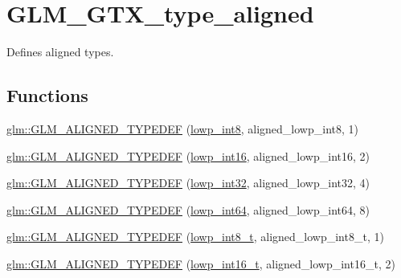 \hypertarget{group__gtx__type__aligned}{}\section{G\+L\+M\+\_\+\+G\+T\+X\+\_\+type\+\_\+aligned}
\label{group__gtx__type__aligned}


Defines aligned types.  


\subsection*{Functions}
\begin{DoxyCompactItemize}
\item 
\hyperlink{group__gtx__type__aligned_gab5cd5c5fad228b25c782084f1cc30114}{glm\+::\+G\+L\+M\+\_\+\+A\+L\+I\+G\+N\+E\+D\+\_\+\+T\+Y\+P\+E\+D\+EF} (\hyperlink{group__gtc__type__precision_gaf9e675b6392764242ae87eb179e9d3d6}{lowp\+\_\+int8}, aligned\+\_\+lowp\+\_\+int8, 1)
\item 
\hyperlink{group__gtx__type__aligned_ga5bb5dd895ef625c1b113f2cf400186b0}{glm\+::\+G\+L\+M\+\_\+\+A\+L\+I\+G\+N\+E\+D\+\_\+\+T\+Y\+P\+E\+D\+EF} (\hyperlink{group__gtc__type__precision_ga71fc0c399fa4780507748b643733f153}{lowp\+\_\+int16}, aligned\+\_\+lowp\+\_\+int16, 2)
\item 
\hyperlink{group__gtx__type__aligned_gac6efa54cf7c6c86f7158922abdb1a430}{glm\+::\+G\+L\+M\+\_\+\+A\+L\+I\+G\+N\+E\+D\+\_\+\+T\+Y\+P\+E\+D\+EF} (\hyperlink{group__gtc__type__precision_gad9939c9d6fec1c6accc02a83c6500f08}{lowp\+\_\+int32}, aligned\+\_\+lowp\+\_\+int32, 4)
\item 
\hyperlink{group__gtx__type__aligned_ga6612eb77c8607048e7552279a11eeb5f}{glm\+::\+G\+L\+M\+\_\+\+A\+L\+I\+G\+N\+E\+D\+\_\+\+T\+Y\+P\+E\+D\+EF} (\hyperlink{group__gtc__type__precision_gab8a8e75af347592406e41b3ae2c0712b}{lowp\+\_\+int64}, aligned\+\_\+lowp\+\_\+int64, 8)
\item 
\hyperlink{group__gtx__type__aligned_ga7ddc1848ff2223026db8968ce0c97497}{glm\+::\+G\+L\+M\+\_\+\+A\+L\+I\+G\+N\+E\+D\+\_\+\+T\+Y\+P\+E\+D\+EF} (\hyperlink{group__gtc__type__precision_gae6092311f6970a305c2df19a372360a3}{lowp\+\_\+int8\+\_\+t}, aligned\+\_\+lowp\+\_\+int8\+\_\+t, 1)
\item 
\hyperlink{group__gtx__type__aligned_ga22240dd9458b0f8c11fbcc4f48714f68}{glm\+::\+G\+L\+M\+\_\+\+A\+L\+I\+G\+N\+E\+D\+\_\+\+T\+Y\+P\+E\+D\+EF} (\hyperlink{group__gtc__type__precision_gae34c3d53c4c1434fc9f26538b0185667}{lowp\+\_\+int16\+\_\+t}, aligned\+\_\+lowp\+\_\+int16\+\_\+t, 2)

\end{DoxyCompactItemize}
